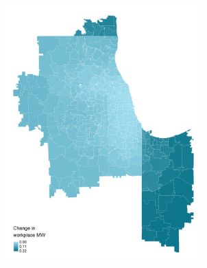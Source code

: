 \documentclass[aspectratio=169, t]{beamer}
\begin{document}
\begin{frame}[label = changes_mw_measures]
\begin{figure}
\begin{subfigure}{0.5\textwidth}
            \includegraphics[width = 0.83\textwidth]{counterfactuals/output/chicago_d_mw_wkp.png}
        \end{subfigure}
    \end{figure}
    
    \vspace{-1.5mm}
    \centering
    \hyperlink{share_pocketed}{}
\end{frame}
\end{document}
